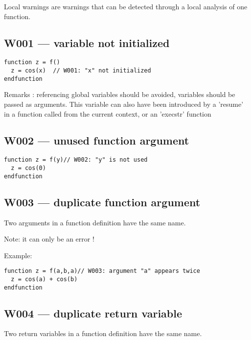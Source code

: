 Local warnings are warnings that can be detected through a local analysis of
one function.



\subsection{W001 --- variable not initialized}


\begin{verbatim}
function z = f()
  z = cos(x)  // W001: "x" not initialized
endfunction
\end{verbatim}


Remarks : referencing global variables should be avoided, variables should be passed as arguments. This variable can also have been introduced by a 'resume' in a function called from the current context, or an 'execstr' function



\subsection{W002 --- unused function argument}


\begin{verbatim}
function z = f(y)// W002: "y" is not used
  z = cos(0)
endfunction
\end{verbatim}


\subsection{W003 --- duplicate function argument}




Two arguments in a function definition have the same name.



Note: it can only be an error !



Example:\begin{verbatim}
function z = f(a,b,a)// W003: argument "a" appears twice
  z = cos(a) + cos(b)
endfunction
\end{verbatim}




\subsection{W004 --- duplicate return variable  }




Two return variables in a function definition have the same name.



